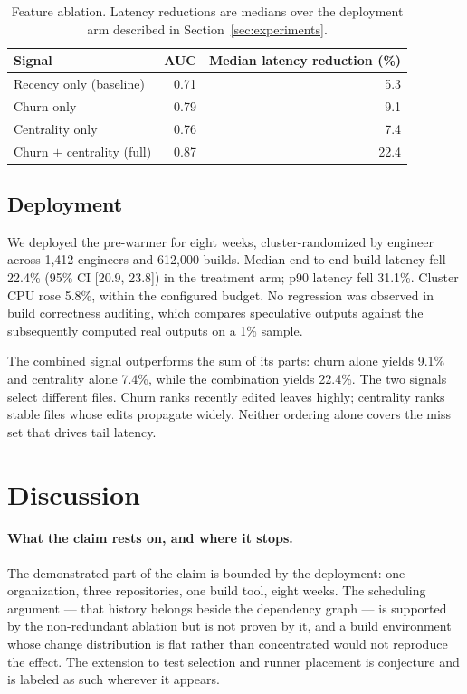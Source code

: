 \documentclass{anvil-paper}
\begin{document}
\begin{table}[t]
  \centering
  \begin{tabular}{lrr}
    \toprule
    Signal & AUC & Median latency reduction (\%) \\
    \midrule
    Recency only (baseline)      & 0.71 & 5.3 \\
    Churn only                   & 0.79 & 9.1 \\
    Centrality only              & 0.76 & 7.4 \\
    Churn $+$ centrality (full)  & 0.87 & 22.4 \\
    \bottomrule
  \end{tabular}
  \caption{Feature ablation. Latency reductions are medians over the
  deployment arm described in Section~\ref{sec:experiments}.}
  \label{tab:ablation}
\end{table}

\subsection{Deployment}

We deployed the pre-warmer for eight weeks, cluster-randomized by engineer
across 1{,}412 engineers and 612{,}000 builds. Median end-to-end build latency
fell 22.4\% (95\% CI [20.9, 23.8]) in the treatment arm; p90 latency fell
31.1\%. Cluster CPU rose 5.8\%, within the configured budget. No regression
was observed in build correctness auditing, which compares speculative outputs
against the subsequently computed real outputs on a 1\% sample.

The combined signal outperforms the sum of its parts: churn alone yields 9.1\%
and centrality alone 7.4\%, while the combination yields 22.4\%. The two
signals select different files. Churn ranks recently edited leaves highly;
centrality ranks stable files whose edits propagate widely. Neither ordering
alone covers the miss set that drives tail latency.

\section{Discussion}
\label{sec:discussion}

\paragraph{What the claim rests on, and where it stops.}
The demonstrated part of the claim is bounded by the deployment: one
organization, three repositories, one build tool, eight weeks. The scheduling
argument --- that history belongs beside the dependency graph --- is supported by
the non-redundant ablation but is not proven by it, and a build environment
whose change distribution is flat rather than concentrated would not reproduce
the effect. The extension to test selection and runner placement is conjecture
and is labeled as such wherever it appears.
\end{document}
